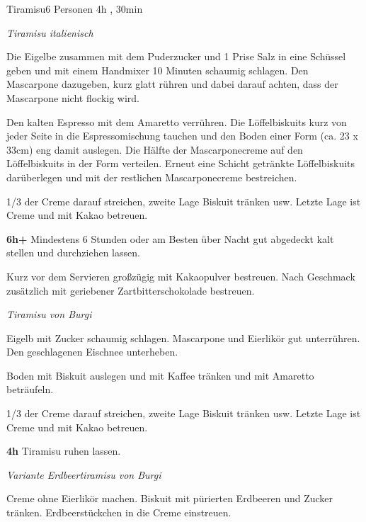 \documentclass[../recipe-collections/cooking.tex]{subfiles}
\begin{document}
\begin{recipe}{Tiramisu}{6 Personen }{4h , 30min }


  \freeform{}\textit{Tiramisu italienisch}


  Die Eigelbe zusammen mit dem Puderzucker und 1 Prise Salz in eine Schüssel geben und mit einem Handmixer 10 Minuten schaumig schlagen.
  Den Mascarpone dazugeben, kurz glatt rühren und dabei darauf achten, dass der Mascarpone nicht flockig wird.


  Den kalten Espresso mit dem Amaretto verrühren.
  Die Löffelbiskuits kurz von jeder Seite in die Espressomischung tauchen und den Boden einer Form (ca. 23 x 33cm) eng damit auslegen.
  Die Hälfte der Mascarponecreme auf den Löffelbiskuits in der Form verteilen.
  Erneut eine Schicht getränkte Löffelbiskuits darüberlegen und mit der restlichen Mascarponecreme bestreichen.

  \newstep{}1/3 der Creme darauf streichen, zweite Lage Biskuit tränken usw.
  Letzte Lage ist Creme und mit Kakao betreuen.

  \newstep{}\textbf{6h+}
  Mindestens 6 Stunden oder am Besten über Nacht gut abgedeckt kalt stellen und durchziehen lassen.

  Kurz vor dem Servieren großzügig mit Kakaopulver bestreuen.
  Nach Geschmack zusätzlich mit geriebener Zartbitterschokolade bestreuen.

  \freeform{}\textit{Tiramisu von Burgi}


  Eigelb mit Zucker schaumig schlagen.
  Mascarpone und Eierlikör gut unterrühren.
  Den geschlagenen Eischnee unterheben.

  \newstep{}Boden mit Biskuit auslegen und mit Kaffee tränken und mit Amaretto beträufeln.

  \newstep{}1/3 der Creme darauf streichen, zweite Lage Biskuit tränken usw.
  Letzte Lage ist Creme und mit Kakao betreuen.

  \newstep{}\textbf{4h}
  Tiramisu ruhen lassen.

  \freeform{}\hrulefill{}

  \freeform{}\textit{Variante Erdbeertiramisu von Burgi}


  Creme ohne Eierlikör machen.
  Biskuit mit pürierten Erdbeeren und Zucker tränken.
  Erdbeerstückchen in die Creme einstreuen.

  \freeform{}\hrulefill{}

\end{recipe}
\end{document}
